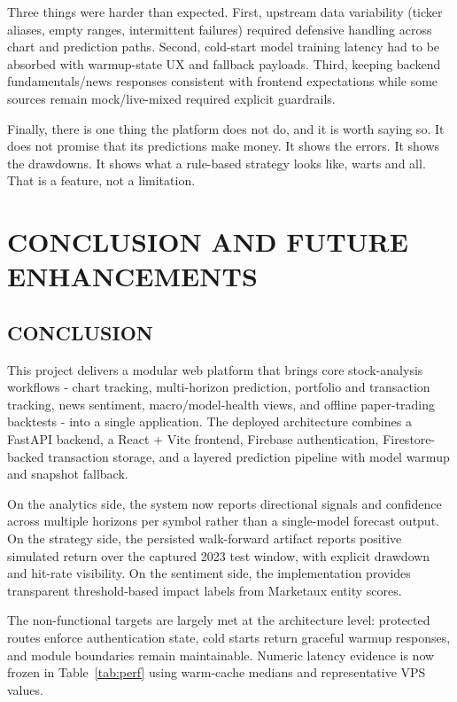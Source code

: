 \documentclass[12pt,a4paper]{report}
\numberwithin{equation}{chapter}
\begin{document}
Three things were harder than expected. First, upstream data variability (ticker aliases, empty ranges, intermittent failures) required defensive handling across chart and prediction paths. Second, cold-start model training latency had to be absorbed with warmup-state UX and fallback payloads. Third, keeping backend fundamentals/news responses consistent with frontend expectations while some sources remain mock/live-mixed required explicit guardrails.

Finally, there is one thing the platform does not do, and it is worth saying so. It does not promise that its predictions make money. It shows the errors. It shows the drawdowns. It shows what a rule-based strategy looks like, warts and all. That is a feature, not a limitation.

\chapter{CONCLUSION AND FUTURE ENHANCEMENTS}

\section{CONCLUSION}

This project delivers a modular web platform that brings core stock-analysis workflows - chart tracking, multi-horizon prediction, portfolio and transaction tracking, news sentiment, macro/model-health views, and offline paper-trading backtests - into a single application. The deployed architecture combines a FastAPI backend, a React + Vite frontend, Firebase authentication, Firestore-backed transaction storage, and a layered prediction pipeline with model warmup and snapshot fallback.

On the analytics side, the system now reports directional signals and confidence across multiple horizons per symbol rather than a single-model forecast output. On the strategy side, the persisted walk-forward artifact reports positive simulated return over the captured 2023 test window, with explicit drawdown and hit-rate visibility. On the sentiment side, the implementation provides transparent threshold-based impact labels from Marketaux entity scores.

The non-functional targets are largely met at the architecture level: protected routes enforce authentication state, cold starts return graceful warmup responses, and module boundaries remain maintainable. Numeric latency evidence is now frozen in Table~\ref{tab:perf} using warm-cache medians and representative VPS values.
\end{document}
